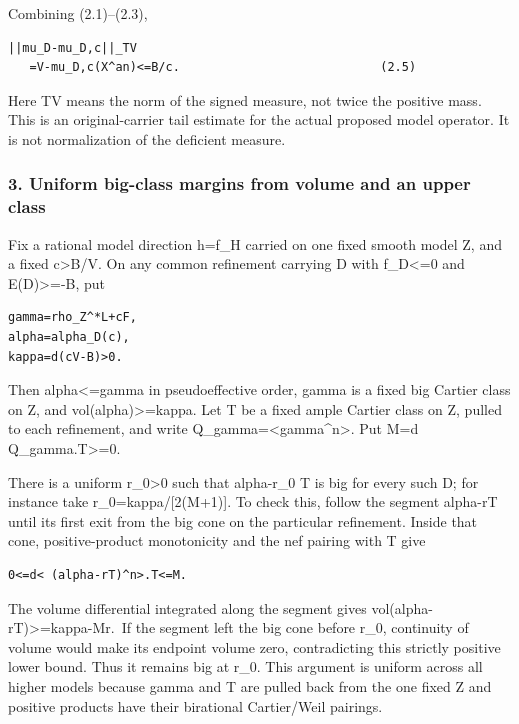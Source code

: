 \documentclass[
  10pt,
]{article}
\begin{document}
Combining (2.1)--(2.3),

\begin{verbatim}
||mu_D-mu_D,c||_TV
   =V-mu_D,c(X^an)<=B/c.                            (2.5)
\end{verbatim}

Here TV means the norm of the signed measure, not twice the positive
mass. This is an original-carrier tail estimate for the actual proposed
model operator. It is not normalization of the deficient measure.

\subsubsection{3. Uniform big-class margins from volume and an upper
class}\label{uniform-big-class-margins-from-volume-and-an-upper-class}

Fix a rational model direction h=f\_H carried on one fixed smooth model
Z, and a fixed c\textgreater B/V. On any common refinement carrying D
with f\_D\textless=0 and E(D)\textgreater=-B, put

\begin{verbatim}
gamma=rho_Z^*L+cF,
alpha=alpha_D(c),
kappa=d(cV-B)>0.
\end{verbatim}

Then alpha\textless=gamma in pseudoeffective order, gamma is a fixed big
Cartier class on Z, and vol(alpha)\textgreater=kappa. Let T be a fixed
ample Cartier class on Z, pulled to each refinement, and write
Q\_gamma=\textless gamma\^{}n\textgreater. Put M=d
Q\_gamma.T\textgreater=0.

There is a uniform r\_0\textgreater0 such that alpha-r\_0 T is big for
every such D; for instance take r\_0=kappa/{[}2(M+1){]}. To check this,
follow the segment alpha-rT until its first exit from the big cone on
the particular refinement. Inside that cone, positive-product
monotonicity and the nef pairing with T give

\begin{verbatim}
0<=d< (alpha-rT)^n>.T<=M.
\end{verbatim}

The volume differential integrated along the segment gives
vol(alpha-rT)\textgreater=kappa-Mr.~If the segment left the big cone
before r\_0, continuity of volume would make its endpoint volume zero,
contradicting this strictly positive lower bound. Thus it remains big at
r\_0. This argument is uniform across all higher models because gamma
and T are pulled back from the one fixed Z and positive products have
their birational Cartier/Weil pairings.
\end{document}
